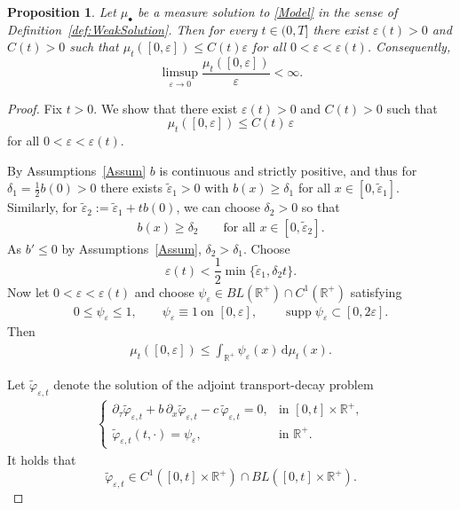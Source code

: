 \documentclass[12pt,a4paper]{amsart}
\newcommand{\ud}{\mathrm{d}}
\newtheorem{proposition}[theorem]{Proposition}
\newcommand{\R}{\mathbb{R}}
\begin{document}
\begin{proposition}
\label{prop:abs_continuity}
Let $\mu_{\bullet}$ be a measure solution to \eqref{Model} in the sense of Definition~\ref{def:WeakSolution}.
Then for every
$t\in(0,T]$ there exist $\varepsilon(t)>0$ and $C(t)>0$ such that $\mu_t([0,\varepsilon])\le
C(t)\varepsilon $ 
for all
$0<\varepsilon<\varepsilon(t)$. Consequently,
\[
\limsup_{\varepsilon\to0}
\frac{\mu_t([0,\varepsilon])}{\varepsilon}
<\infty .
\]
\end{proposition}

\begin{proof}
Fix $t>0$. We show that there exist $\varepsilon(t)>0$ and $C(t)>0$ such that
\[
\mu_t([0,\varepsilon])\le C(t)\,\varepsilon
\]
for all $0<\varepsilon<\varepsilon(t)$.


\noindent By Assumptions~\ref{Assum} $b$ is continuous and strictly positive, and thus
for $\delta_1=\frac 1 2 b(0)>0$ there exists $\widetilde\varepsilon_1>0$  with  $b(x)\ge \delta_1$
 for all $x\in[0,\widetilde\varepsilon_1]$. 
Similarly, for $\tilde \varepsilon_2:=\tilde \varepsilon_1+tb(0)$, we can choose $\delta_2>0$ so that 
    \begin{align}
    \label{delta_2_bound}
        b(x)\geq \delta_2\qquad\text{for all }x\in[0,\widetilde\varepsilon_2].
    \end{align}
As $b'\leq 0$ by Assumptions~\ref{Assum}, $\delta_2>\delta_1$. Choose 
\[
\varepsilon(t)
<
\frac12\min\{\widetilde\varepsilon_1,\delta_2 t\}.
\]
\noindent Now let $0<\varepsilon<\varepsilon(t)$ and choose $\psi_\varepsilon\in BL(\R^+)\cap C^1(\R^+)$ satisfying
\begin{align*}
0\le \psi_\varepsilon\le 1,\qquad
\psi_\varepsilon\equiv 1 \ \text{on }[0,\varepsilon],
\qquad
\operatorname{supp}\psi_\varepsilon\subset[0,2\varepsilon].
\end{align*}
Then
\begin{align}
\label{estimate_mu_t}
\mu_t([0,\varepsilon])
\le
\int_{\R^+}\psi_\varepsilon(x)\,\ud\mu_t(x).
\end{align}


\noindent Let $\tilde \varphi_{\varepsilon,t}$ denote the solution of the adjoint
transport-decay problem
\begin{align}
\label{adjusted_dual_problem}
\left\{
\begin{array}{lll}
\partial_{\tau}\tilde \varphi_{\varepsilon,t}
+b\,\partial_x\tilde \varphi_{\varepsilon,t}
-c\,\tilde \varphi_{\varepsilon,t}
=0,
& \text{in } [0,t]\times\R^+,\\[1mm]
\tilde \varphi_{\varepsilon,t}(t,\cdot)
=\psi_\varepsilon,
& \text{in } \R^+.
\end{array}
\right.
\end{align}
It holds that
\[
\tilde \varphi_{\varepsilon,t}\in
C^1([0,t]\times\R^+)\cap BL([0,t]\times\R^+).
\]



\end{proof}
\end{document}
